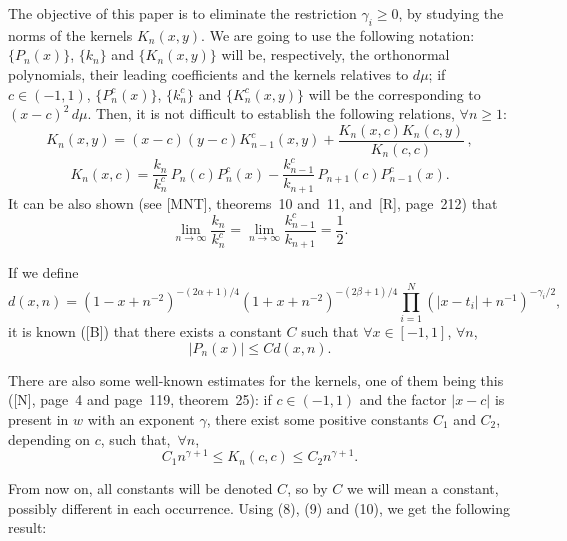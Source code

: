 \documentclass[a4paper,12pt]{article}
\theoremstyle{plain}
\theoremstyle{definition}
\begin{document}
The objective of this paper is to eliminate the restriction $\gamma_{i} \geq 0$,
by studying the norms of the kernels $K_{n}(x,y)$. We are going
to use the following notation: $\{P_{n}(x)\}$, $\{k_{n}\}$ and
$\{K_{n}(x,y)\}$ will be, respectively, the orthonormal polynomials,
their leading coefficients and the kernels relatives to $d\mu$;
if $c \in (-1,1)$, $\{P_{n}^{c}(x)\}$,
$\{k_{n}^{c}\}$ and $\{K_{n}^{c}(x,y)\}$ will be the corresponding
to $(x-c)^{2}\,d\mu$. Then, it is not difficult to establish
the following relations, $\forall n \geq 1$:
\begin{equation}
K_{n}(x,y) = (x-c) (y-c) K_{n-1}^{c}(x,y)
+ \frac{K_{n}(x,c)K_{n}(c,y)}{K_{n}(c,c)}\,,
\tag{7}
\end{equation}
\begin{equation}
K_{n}(x,c) = \frac{k_{n}}{k_{n}^{c}}\, P_{n}(c) P_{n}^{c}(x)
- \frac{k_{n-1}^{c}}{k_{n+1}}\, P_{n+1}(c) P_{n-1}^{c}(x).
\tag{8}
\end{equation}
It can be also shown (see [MNT], theorems~10 and~11, and~[R],
page~212) that
\begin{equation}
\lim_{n \to \infty} \frac{k_{n}}{k_{n}^{c}}
= \lim_{n \to \infty} \frac{k_{n-1}^{c}}{k_{n+1}}
= \frac{1}{2}.
\tag{9}
\end{equation}

If we define
$$
d(x,n) = (1 - x + n^{-2})^{-(2\alpha+1)/4}
(1 + x + n^{-2})^{-(2\beta+1)/4}
\prod_{i=1}^{N} ( | x-t_{i}| + n^{-1})^{-\gamma_{i}/2},
$$
it is known ([B]) that there exists a constant $C$ such that
$\forall x \in [-1,1]$, $\forall n$,
\begin{equation}
| P_{n}(x) | \leq C d(x,n).
\tag{10}
\end{equation}

There are also some well-known estimates for the kernels, one
of them being this ([N], page~4 and page~119, theorem~25): if
$c \in (-1,1)$ and the factor $| x - c |$
is present in $w$ with an exponent $\gamma$, there exist some
positive constants $C_{1}$ and $C_{2}$, depending on $c$,
such that,~$\forall n$,
\begin{equation}
C_{1} n^{\gamma+1} \leq K_{n}(c,c) \leq C_{2} n^{\gamma+1}.
\tag{11}
\end{equation}

From now on, all constants will be denoted $C$, so by $C$ we will
mean a constant, possibly different in each occurrence. Using
(8), (9) and (10), we get the following result:
\end{document}
